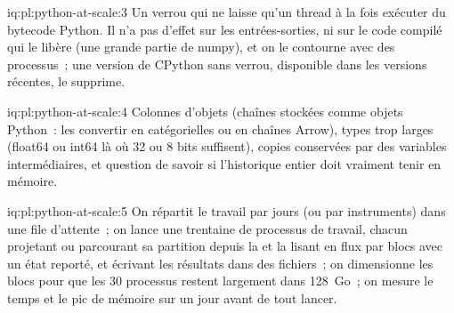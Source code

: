 \begin{solution}{iq:pl:python-at-scale:3}
Un verrou qui ne laisse qu'un thread à la fois exécuter du bytecode Python. Il n'a pas d'effet sur les entrées-sorties, ni sur le code compilé qui le libère
(une grande partie de numpy), et on le contourne avec des processus~; une version de CPython sans verrou, disponible dans les versions récentes, le supprime.
\end{solution}

\begin{solution}{iq:pl:python-at-scale:4}
Colonnes d'objets (chaînes stockées comme objets Python~: les convertir en catégorielles ou en chaînes Arrow), types trop larges (float64 ou int64 là où 32 ou 8 bits
suffisent), copies conservées par des variables intermédiaires, et question de savoir si l'historique entier doit vraiment tenir en mémoire.
\end{solution}

\begin{solution}{iq:pl:python-at-scale:5}
On répartit le travail par jours (ou par instruments) dans une file d'attente~; on lance une trentaine de processus de travail, chacun projetant ou parcourant sa partition
depuis la  et la lisant en flux par blocs avec un état reporté, et écrivant les résultats dans des fichiers~; on dimensionne les blocs pour que les 30 processus restent
largement dans 128~Go~; on mesure le temps et le pic de mémoire sur un jour avant de tout lancer.
\end{solution}
